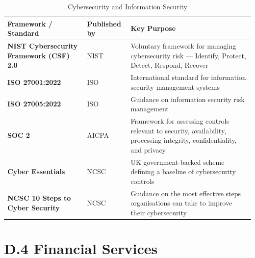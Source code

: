 \begin{table}[H]
  \centering
  \renewcommand{\arraystretch}{1.5}
  \begin{tabularx}{\textwidth}{ | >{\raggedright\arraybackslash}p{} 
								| >{\raggedright\arraybackslash}p{} 
                                | >{\raggedright\arraybackslash}X | }
    \hline
    \textbf{Framework / Standard} & \textbf{Published by} & \textbf{Key Purpose} \\
    \hline
    \textbf{NIST Cybersecurity Framework (CSF) 2.0} & NIST & Voluntary framework for managing cybersecurity risk — Identify, Protect, Detect, Respond, Recover\\
    \hline
    \textbf{ISO 27001:2022} & ISO & International standard for information security management systems\\
    \hline
    \textbf{ISO 27005:2022} & ISO & Guidance on information security risk management\\
    \hline
    \textbf{SOC 2} & AICPA & Framework for assessing controls relevant to security, availability, processing integrity, confidentiality, and privacy\\
    \hline
    \textbf{Cyber Essentials} & NCSC & UK government-backed scheme defining a baseline of cybersecurity controls\\
    \hline
    \textbf{NCSC 10 Steps to Cyber Security} & NCSC & Guidance on the most effective steps organisations can take to improve their cybersecurity\\
    \hline
  \end{tabularx}
  \caption{Cybersecurity and Information Security}
\end{table}

\section*{D.4 Financial Services}

